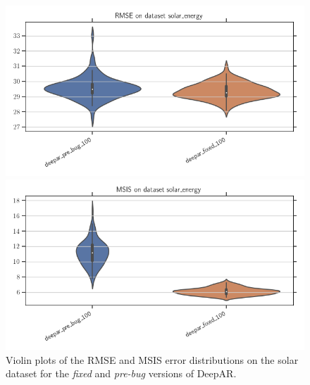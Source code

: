 \begin{figure}[ht]
  \centering
  \begin{minipage}[b]{0.95\linewidth}
    \centering
    \includegraphics[width=\linewidth]{./img/crayon_study/RMSE_pre_and_fixed_solar.png}
  \end{minipage}%

  \begin{minipage}[b]{0.95\linewidth}
    \centering
    \includegraphics[width=\linewidth]{./img/crayon_study/MSIS_pre_and_fixed_solar.png}
  \end{minipage}
  \caption{Violin plots of the RMSE and MSIS error distributions on the solar dataset for the \textit{fixed} and \textit{pre-bug} versions of DeepAR.}
  \label{fig:crayon_as_test_deepar_prepost_solar}
\end{figure}


